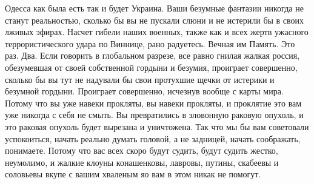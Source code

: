 Одесса как была есть так и будет Украина. Ваши безумные фантазии никогда не
станут реальностью, сколько бы вы не пускали слюни и не истерили бы в своих
лживых эфирах. Насчет гибели наших военных, также как и всех жертв ужасного
террористического удара по Виннице, рано радуетесь. Вечная им Память. Это раз.
Два. Если говорить в глобальном разрезе, все равно гнилая жалкая россия,
обезумевшая от своей собственной гордыни и безумия, проиграет совершенно,
сколько бы вы тут не надували бы свои протухшие щечки от истерики и безумной
гордыни. Проиграет совершенно, исчезнув вообще с карты мира.  Потому что вы уже
навеки прокляты, вы навеки прокляты, и проклятие это вам уже никогда с себя не
смыть. Вы превратились в зловонную раковую опухоль, и это раковая опухоль будет
вырезана и уничтожена. Так что мы бы вам советовали успокоиться, начать реально
думать головой, а не задницей, начать соображать, понимаете. Потому что вас
всех скоро будут судить, будут судить жестко, неумолимо, и жалкие клоуны
конашенковы, лавровы, путины, скабеевы и соловьевы вкупе с вашим хваленым яо
вам в этом никак не помогут.
